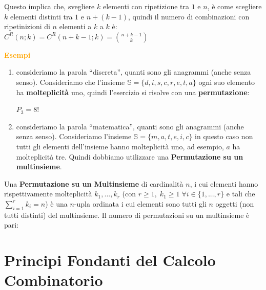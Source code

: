 \begin{flushleft}
\begin{boxA}
        Questo implica che, svegliere $k$ elementi con ripetizione tra $1$ e $n$, è come scegliere $k$ elementi distinti tra $1$ e $n + (k - 1)$, quindi il numero di combinazioni con ripetinizioni di $n$ elementi a $k$ a $k$ è: $C^R(n; k) = C^R(n + k -1; k) = \binom{n + k - 1}{k}$ 
    \end{boxA}
    \begin{boxA}
        \textcolor{orange}{\textbf{Esempi}}
        \begin{enumerate}[nosep]
            \item consideriamo la parola ``discreta'', quanti sono gli anagrammi (anche senza senso). Consideriamo che l'insieme $\mathbb{S} = \{d, i, s, c, r, e, t, a\}$ ogni suo elemento ha \textbf{molteplicità} uno, quindi l'esercizio si risolve con una \textbf{permutazione}:

            {\centering
                $P_3 = 8!$
            \par}
            \item consideriamo la parola ``matematica'', quanti sono gli anagrammi (anche senza senso). Consideriamo l'insieme $\mathbb{S} = \{m, a, t, e, i,c\}$ in questo caso non tutti gli elementi dell'insieme hanno molteplicità uno, ad esempio, $a$ ha molteplicità tre. Quindi dobbiamo utilizzare una \textbf{Permutazione su un multinsieme}.
        \end{enumerate}
    \end{boxA}

    Una \textbf{Permutazione su un Multinsieme} di cardinalità $n$, i cui elementi hanno rispettivamente molteplicità $k_1, ..., k_r$ (con $r \geq 1, \; k_1 \geq 1 \; \forall i \in \{1, ..., r\}$ e tali che $\sum_{i = 1}^r k_i = n$) è una $n$-upla ordinata i cui elementi sono tutti gli $n$ oggetti (non tutti distinti) del multinsieme. Il numero di permutazioni su un multinsieme è pari:

    {\centering
    \par}
\end{flushleft}

\section{Principi Fondanti del Calcolo Combinatorio}

